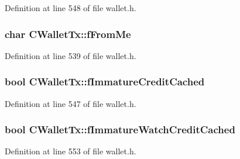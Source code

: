 Definition at line 548 of file wallet.\+h.

\hypertarget{class_c_wallet_tx_a1598bf4a18fd05ce5eaaa0c3eb58ff28}{}
\subsubsection[{f\+From\+Me}]{\setlength{\rightskip}{0pt plus 5cm}char C\+Wallet\+Tx\+::f\+From\+Me}\label{class_c_wallet_tx_a1598bf4a18fd05ce5eaaa0c3eb58ff28}


Definition at line 539 of file wallet.\+h.

\hypertarget{class_c_wallet_tx_a9f52bb55d93a7ffe20e93a4f12487815}{}
\subsubsection[{f\+Immature\+Credit\+Cached}]{\setlength{\rightskip}{0pt plus 5cm}bool C\+Wallet\+Tx\+::f\+Immature\+Credit\+Cached\hspace{0.3cm}{\ttfamily [mutable]}}\label{class_c_wallet_tx_a9f52bb55d93a7ffe20e93a4f12487815}


Definition at line 547 of file wallet.\+h.

\hypertarget{class_c_wallet_tx_a15c52b4c9a7ee5e87f86324c7e08fe96}{}
\subsubsection[{f\+Immature\+Watch\+Credit\+Cached}]{\setlength{\rightskip}{0pt plus 5cm}bool C\+Wallet\+Tx\+::f\+Immature\+Watch\+Credit\+Cached\hspace{0.3cm}{\ttfamily [mutable]}}\label{class_c_wallet_tx_a15c52b4c9a7ee5e87f86324c7e08fe96}


Definition at line 553 of file wallet.\+h.

\hypertarget{class_c_wallet_tx_ac058c61be3a1c680a3ad384ff04d27eb}{}
